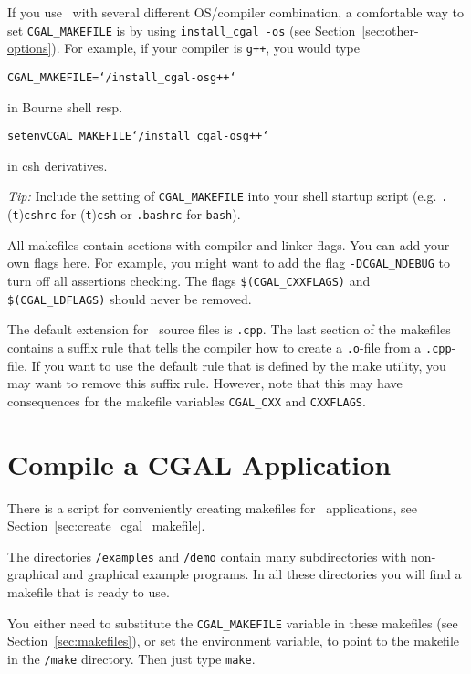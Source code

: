 If you use \cgal\ with several different OS/compiler combination, a
comfortable way to set \texttt{CGAL\_MAKEFILE} is by using
\texttt{install\_cgal~-os} (see Section~\ref{sec:other-options}).  For
example, if your compiler is \texttt{g++}, you would type
\begin{alltt}
CGAL_MAKEFILE=`\yourcgaldir/install_cgal -os g++`
\end{alltt}
in Bourne shell resp.
\begin{alltt}
setenv CGAL_MAKEFILE `\yourcgaldir/install_cgal -os g++`
\end{alltt}
in csh derivatives.

\textit{Tip:} Include the setting of \texttt{CGAL\_MAKEFILE} into your
shell startup script (e.g. \texttt{.}(\texttt{t})\texttt{cshrc} for
(\texttt{t})\texttt{csh} or \texttt{.bashrc} for \texttt{bash}).

All makefiles contain sections with compiler and linker flags.  You
can add your own flags here. For example, you might want to add the
flag \texttt{-DCGAL\_NDEBUG} to turn off all assertions
checking. The flags \texttt{\$(CGAL\_CXXFLAGS)} and
\texttt{\$(CGAL\_LDFLAGS)} should never be removed.

The default extension for \cgal\ source files is \texttt{.cpp}.  The
last section of the makefiles contains a suffix rule that tells the
compiler how to create a \texttt{.o}-file from a \texttt{.cpp}-file.  If
you want to use the default rule that is defined by the make utility,
you may want to remove this suffix rule.  However, note that this may
have consequences for the makefile variables \texttt{CGAL\_CXX} and
\texttt{CXXFLAGS}.

\section{Compile a CGAL Application\label{sec:appl}}

There is a script for conveniently creating makefiles for \cgal\
applications, see Section~\ref{sec:create_cgal_makefile}.

The directories \texttt{\cgaldir/examples} and \texttt{\cgaldir/demo}
contain many subdirectories with non-graphical and graphical example
programs. In all these directories you will find a makefile that is
ready to use.

You either need to substitute the \texttt{CGAL\_MAKEFILE} variable in
these makefiles (see Section~\ref{sec:makefiles}), or set the
environment variable, to point to the makefile in the
\texttt{\cgaldir/make} directory. Then just type \texttt{make}.

